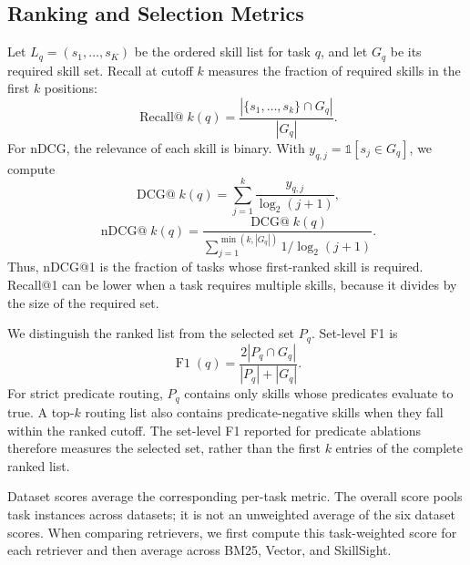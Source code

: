 \subsection{Ranking and Selection Metrics}
\label{app:routing-metrics}
Let $L_q=(s_1,\ldots,s_K)$ be the ordered skill list for task $q$, and let $G_q$ be its required skill set. Recall at cutoff $k$ measures the fraction of required skills in the first $k$ positions:
\[
\operatorname{Recall@}k(q)=\frac{|\{s_1,\ldots,s_k\}\cap G_q|}{|G_q|}.
\]
For nDCG, the relevance of each skill is binary. With $y_{q,j}=\mathds{1}[s_j\in G_q]$, we compute
\[
\operatorname{DCG@}k(q)=\sum_{j=1}^{k}\frac{y_{q,j}}{\log_2(j+1)},
\]
\[
\operatorname{nDCG@}k(q)=\frac{\operatorname{DCG@}k(q)}{\sum_{j=1}^{\min(k,|G_q|)}1/\log_2(j+1)}.
\]
Thus, nDCG@1 is the fraction of tasks whose first-ranked skill is required. Recall@1 can be lower when a task requires multiple skills, because it divides by the size of the required set.

We distinguish the ranked list from the selected set $P_q$. Set-level F1 is
\[
\operatorname{F1}(q)=\frac{2|P_q\cap G_q|}{|P_q|+|G_q|}.
\]
For strict predicate routing, $P_q$ contains only skills whose predicates evaluate to true. A top-$k$ routing list also contains predicate-negative skills when they fall within the ranked cutoff. The set-level F1 reported for predicate ablations therefore measures the selected set, rather than the first $k$ entries of the complete ranked list.

Dataset scores average the corresponding per-task metric. The overall score pools task instances across datasets; it is not an unweighted average of the six dataset scores. When comparing retrievers, we first compute this task-weighted score for each retriever and then average across BM25, Vector, and SkillSight.
